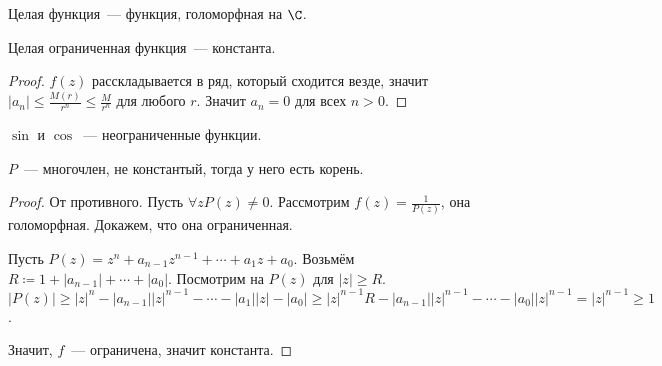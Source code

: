 \begin{definition}
    Целая функция~--- функция, голоморфная на $\C$.
\end{definition}

\begin{theorem}[Лиувилль]

    Целая ограниченная функция~--- константа.
\end{theorem}

\begin{proof}
    $f(z)$ расскладывается в ряд, который сходится везде,
    значит $|a_n| \le \frac{M(r)}{r^n} \le \frac{M}{r^n}$
    для любого $r$. Значит $a_n = 0$ для всех $n > 0$.
\end{proof}

\begin{consequence}
    $\sin$ и $\cos$~--- неограниченные функции.
\end{consequence}

\begin{theorem}

    $P$~--- многочлен, не константый,
    тогда у него есть корень.
\end{theorem}

\begin{proof}
    От противного.
    Пусть $\forall z P(z) \ne 0$.
    Рассмотрим $f(z) = \frac{1}{P(z)}$,
    она голоморфная.
    Докажем, что она ограниченная.

    Пусть $P(z) = z^n + a_{n-1}z^{n-1} +
        \cdots + a_1z + a_0$.
    Возьмём $R \coloneqq 1 + |a_{n-1}| + \cdots
        + |a_0|$.
    Посмотрим на $P(z)$ для $|z| \ge R$.
    $|P(z)| \ge |z|^n - |a_{n-1}||z|^{n-1}
        - \cdots - |a_1||z| - |a_0|
        \ge |z|^{n-1}R - |a_{n-1}||z|^{n-1} -
        \cdots - |a_0||z|^{n-1} = |z|^{n-1} \ge 1$.

    Значит, $f$~--- ограничена, значит константа.
\end{proof}
